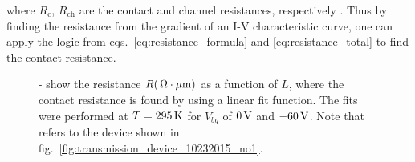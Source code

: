 where $R_\mathrm{c}$, $R_\mathrm{ch}$ are the contact and channel resistances, respectively \cite{Schroder_Semiconductor2006}. Thus by finding the resistance from the gradient of an I-V characteristic curve, one can apply the logic from eqs.~\ref{eq:resistance_formula} and \ref{eq:resistance_total} to find the contact resistance.
\begin{figure}[ht]
	\centering
	\qquad
	\qquad
	\caption[Contact resistance of $0.05\%$  doped  channel device]{\protect{}-\protect{} show the resistance $R (\,\mathrm{\Omega\cdot\mu m})$ as a function of $L$, where the contact resistance is found by using a linear fit function. The fits were performed at $T=295\,\mathrm{K}$ for $V_{bg}$ of $0\,\mathrm{V}$ and $-60\,\mathrm{V}$. Note that \protect{} refers to the device shown in fig.~\ref{fig:transmission_device_10232015_no1}.}
	\label{fig:tlm_reistance_measurement}
\end{figure}
